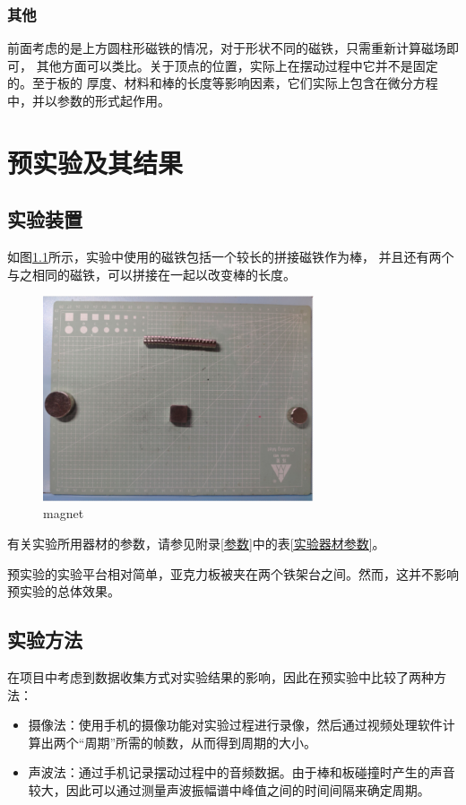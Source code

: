 \documentclass[AutoFakeBold]{LZUThesis}
\begin{document}
\subsection{其他}
前面考虑的是上方圆柱形磁铁的情况，对于形状不同的磁铁，只需重新计算磁场即可，
其他方面可以类比。关于顶点的位置，实际上在摆动过程中它并不是固定的。至于板的
厚度、材料和棒的长度等影响因素，它们实际上包含在微分方程中，并以参数的形式起作用。

\chapter{预实验及其结果}
\section{实验装置}

如图\ref{magnet}所示，实验中使用的磁铁包括一个较长的拼接磁铁作为棒，
并且还有两个与之相同的磁铁，可以拼接在一起以改变棒的长度。
\begin{figure}[H]
    \centering
    \includegraphics[width=8cm]{figures/magnet.png}
    \caption{magnet}
    \label{magnet}
\end{figure}

有关实验所用器材的参数，请参见附录\ref{参数}中的表\ref{实验器材参数}。

预实验的实验平台相对简单，亚克力板被夹在两个铁架台之间。然而，这并不影响预实验的总体效果。

\section{实验方法}
在项目中考虑到数据收集方式对实验结果的影响，因此在预实验中比较了两种方法：

\begin{itemize}
    \item 摄像法：使用手机的摄像功能对实验过程进行录像，然后通过视频处理软件计算出两个“周期”所需的帧数，从而得到周期的大小。
    \item 声波法：通过手机记录摆动过程中的音频数据。由于棒和板碰撞时产生的声音较大，因此可以通过测量声波振幅谱中峰值之间的时间间隔来确定周期。
\end{itemize}
\end{document}
